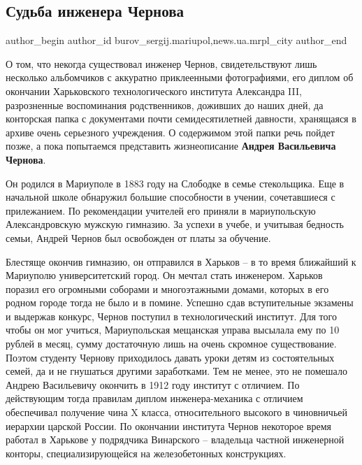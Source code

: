  
 
 
 
 
 
\subsection{Судьба инженера Чернова}
\label{sec:19_05_2018.stz.news.ua.mrpl_city.1.sudba_inzhenera_chernova}
 
\ifcmt
 author_begin
   author_id burov_sergij.mariupol,news.ua.mrpl_city
 author_end
\fi

О том, что некогда существовал инженер Чернов, свидетельствуют лишь несколько
альбомчиков с аккуратно приклеенными фотографиями, его диплом об окончании
Харьковского технологического института Александра III, разрозненные
воспоминания родственников, доживших до наших дней, да конторская папка с
документами почти семидесятилетней давности, хранящаяся в архиве очень
серьезного учреждения. О содержимом этой папки речь пойдет позже, а пока
попытаемся представить жизнеописание \textbf{Андрея Васильевича Чернова}.


Он родился в Мариуполе в 1883 году на Слободке в семье стекольщика. Еще в
начальной школе обнаружил большие способности в учении, сочетавшиеся с
прилежанием. По рекомендации учителей его приняли в мариупольскую
Александровскую мужскую гимназию. За успехи в учебе, и учитывая бедность семьи,
Андрей Чернов был освобожден от платы за обучение.

Блестяще окончив гимназию, он отправился в Харьков – в то время ближайший к
Мариуполю университетский город. Он мечтал стать инженером. Харьков поразил его
огромными соборами и многоэтажными домами, которых в его родном городе тогда не
было и в помине. Успешно сдав вступительные экзамены и выдержав конкурс, Чернов
поступил в технологический институт. Для того чтобы он мог учиться,
Мариупольская мещанская управа высылала ему по 10 рублей в месяц, сумму
достаточную лишь на очень скромное существование. Поэтом студенту Чернову
приходилось давать уроки детям из состоятельных семей, да и не гнушаться
другими заработками. Тем не менее, это не помешало Андрею Васильевичу окончить
в 1912 году институт с отличием. По действующим тогда правилам диплом
инженера-механика с отличием обеспечивал получение чина X класса,
относительного высокого в чиновничьей иерархии царской России. По окончании
института Чернов некоторое время работал в Харькове у подрядчика Винарского –
владельца частной инженерной конторы, специализирующейся на железобетонных
конструкциях.

